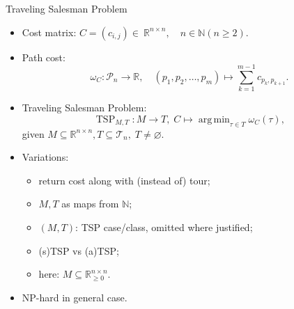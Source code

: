 \documentclass[
  size=8pt,
  style=klope,
  paper=screen,
  mode=present,
  nohandoutpagebreaks,
  pauseslide,
  hlsections,
  fleqn,
]{powerdot}
\DeclareMathOperator*{\argmin}{arg\,min}
\def\eqitspace{\vspace{-5mm}}
\begin{document}
\begin{slide}{Traveling Salesman Problem}
\begin{itemize}
  \item
  Cost matrix: $C = \left(c_{i,j}\right) \in~\mathbb{R}^{n \times n},
    \quad n \in \mathbb{N} \left(n \geq 2\right)$.
  \item
  Path cost:
  \vspace{-2mm}
  \begin{equation}
    \omega_C: \mathcal{P}_n \to \mathbb{R}, \quad
    \left(p_1,p_2,\ldots,p_m\right) \mapsto \sum_{k=1}^{m-1} c_{p_k,p_{k+1}}.
  \end{equation}
  \eqitspace%
  \item
  Traveling Salesman Problem:
  \begin{equation}
    \operatorname{TSP}_{M,T} : M \to T, \; C \mapsto \argmin_{\tau \in T} \omega_C\left(\tau\right),
  \end{equation}
  given $M \subseteq \mathbb{R}^{n \times n}, T \subseteq \mathcal{T}_n, \; T \neq \varnothing$.
  \item
  Variations:
  \begin{itemize}
  \item return cost along with (instead of) tour;
  \item $M, T$ as maps from $\mathbb{N}$;
  \item $(M, T)$: TSP case/class, omitted where justified;
  \item (s)TSP vs (a)TSP\@;
  \item here: $M \subseteq \mathbb{R}^{n \times n}_{\geq 0}$.
  \end{itemize}
  \vspace{-2mm}
  \item
  NP-hard in general case.
\end{itemize}
\end{slide}
\end{document}
